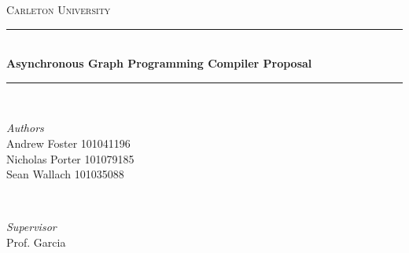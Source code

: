 \documentclass[11pt]{article}
\begin{document}

\begin{titlepage} %
	\newcommand{\HRule}{\rule{\linewidth}{0.5mm}} %
	
	\center %
	
	
	\textsc{\LARGE Carleton University}\\[1.5cm] 
	
	
	
	\HRule\\[0.4cm]
	
	{\huge\bfseries Asynchronous Graph Programming Compiler Proposal}\\[0.4cm] 
	
	\HRule\\[1.5cm]
	
	
	\begin{minipage}{0.4\textwidth}
		\begin{flushleft}
			\large
			\textit{Authors}\\
			Andrew Foster \textsc{101041196}\\
			Nicholas Porter \textsc{101079185}\\
			Sean Wallach \textsc{101035088} 
		\end{flushleft}
	\end{minipage}
	~
	\begin{minipage}{0.4\textwidth}
		\begin{flushright}
			\large
			\textit{Supervisor}\\
			Prof. Garcia 
		\end{flushright}
	\end{minipage}
	
	
	
	

\end{titlepage}
\end{document}
